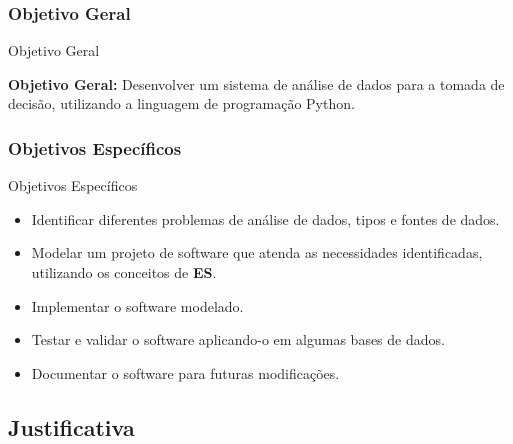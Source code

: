 \subsubsection{Objetivo Geral}
\label{subsubsec:objetivo-geral}

\begin{frame}{Objetivo Geral}

	\textbf{Objetivo Geral:} Desenvolver um sistema de análise de dados para a tomada de decisão, utilizando a linguagem de programação Python.

\end{frame}

\subsubsection{Objetivos Específicos}
\label{subsubsec:objetivos-especificos}

\begin{frame}{Objetivos Específicos}

	\begin{itemize}
		\item Identificar diferentes problemas de análise de dados, tipos e fontes de dados.
		\item Modelar um projeto de software que atenda as necessidades identificadas, utilizando os conceitos de \textbf{ES}.
		\item Implementar o software modelado.
		\item Testar e validar o software aplicando-o em algumas bases de dados.
		\item Documentar o software para futuras modificações.
    \end{itemize}

\end{frame}

\subsection{Justificativa}
\label{subsec:justificativa}

